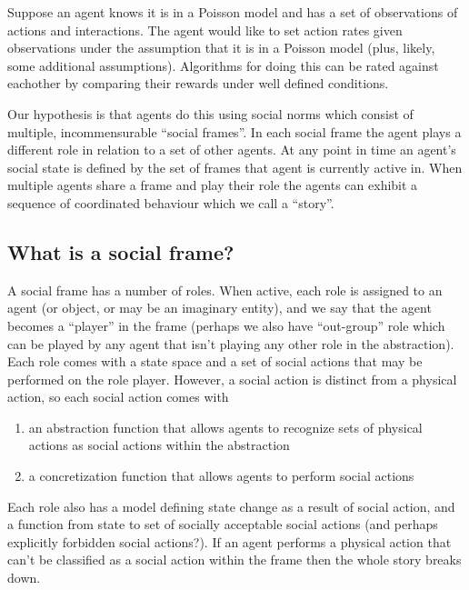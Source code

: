 \documentclass[a4paper]{article}
\begin{document}
Suppose an agent knows it is in a Poisson model and has a set of observations of actions and interactions. The agent would like to set action rates given observations under the assumption that it is in a Poisson model (plus, likely, some additional assumptions). Algorithms for doing this can be rated against eachother by comparing their rewards under well defined conditions.

Our hypothesis is that agents do this using social norms which consist of multiple, incommensurable ``social frames''. In each social frame the agent plays a different role in relation to a set of other agents. At any point in time an agent's social state is defined by the set of frames that agent is currently active in. When multiple agents share a frame and play their role the agents can exhibit a sequence of coordinated behaviour which we call a ``story''.

\subsection{What is a social frame?}

A social frame has a number of roles. When active, each role is assigned to an agent (or object, or may be an imaginary entity), and we say that the agent becomes a ``player'' in the frame (perhaps we also have ``out-group'' role which can be played by any agent that isn't playing any other role in the abstraction). Each role comes with a state space and a set of social actions that may be performed on the role player. However, a social action is distinct from a physical action, so each social action comes with
\begin{enumerate}
	\item an abstraction function that allows agents to recognize sets of physical actions as social actions within the abstraction
	\item a concretization function that allows agents to perform social actions	
\end{enumerate}

Each role also has a model defining state change as a result of social action, and a function from state to set of socially acceptable social actions (and perhaps explicitly forbidden social actions?). If an agent performs a physical action that can't be classified as a social action within the frame then the whole story breaks down.
\end{document}

